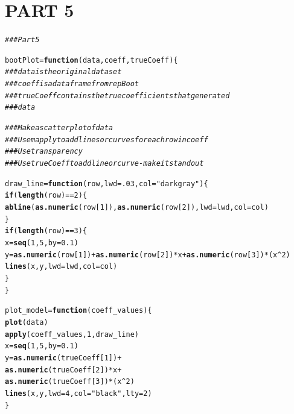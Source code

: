 \documentclass[11pt]{article}\usepackage[]{graphicx}\usepackage[]{color}
\makeatletter
\newcommand{\hlnum}[1]{\textcolor[rgb]{0.686,0.059,0.569}{#1}}%
\newcommand{\hlstr}[1]{\textcolor[rgb]{0.192,0.494,0.8}{#1}}%
\newcommand{\hlcom}[1]{\textcolor[rgb]{0.678,0.584,0.686}{\textit{#1}}}%
\newcommand{\hlopt}[1]{\textcolor[rgb]{0,0,0}{#1}}%
\newcommand{\hlstd}[1]{\textcolor[rgb]{0.345,0.345,0.345}{#1}}%
\newcommand{\hlkwa}[1]{\textcolor[rgb]{0.161,0.373,0.58}{\textbf{#1}}}%
\newcommand{\hlkwb}[1]{\textcolor[rgb]{0.69,0.353,0.396}{#1}}%
\newcommand{\hlkwc}[1]{\textcolor[rgb]{0.333,0.667,0.333}{#1}}%
\newcommand{\hlkwd}[1]{\textcolor[rgb]{0.737,0.353,0.396}{\textbf{#1}}}%
\newenvironment{kframe}{%
 \def\at@end@of@kframe{}%
 \ifinner\ifhmode%
  \def\at@end@of@kframe{\end{minipage}}%
  \begin{minipage}{\columnwidth}%
 \fi\fi%
 \def\FrameCommand##1{\hskip\@totalleftmargin \hskip-\fboxsep
 \colorbox{shadecolor}{##1}\hskip-\fboxsep
     \hskip-\linewidth \hskip-\@totalleftmargin \hskip\columnwidth}%
 \MakeFramed {\advance\hsize-\width
   \@totalleftmargin\z@ \linewidth\hsize
   \@setminipage}}%
 {\par\unskip\endMakeFramed%
 \at@end@of@kframe}
\newenvironment{knitrout}{}{} %
\makeatother
\begin{document}
\section{PART 5}
\begin{knitrout}
\color{fgcolor}\begin{kframe}
\begin{alltt}
\hlcom{## # Part 5}

\hlstd{bootPlot} \hlkwb{=} \hlkwa{function}\hlstd{(}\hlkwc{data}\hlstd{,} \hlkwc{coeff}\hlstd{,} \hlkwc{trueCoeff}\hlstd{)\{}
  \hlcom{### data is the original data set}
  \hlcom{### coeff is a data frame from repBoot}
  \hlcom{### trueCoeff contains the true coefficients that generated}
  \hlcom{### data}

  \hlcom{### Make a scatter plot of data}
  \hlcom{### Use mapply to add lines or curves for each row in coeff}
  \hlcom{### Use transparency}
  \hlcom{### Use trueCoeff to add line or curve - make it stand out}

  \hlstd{draw_line} \hlkwb{=} \hlkwa{function}\hlstd{(}\hlkwc{row}\hlstd{,} \hlkwc{lwd} \hlstd{=} \hlnum{.03}\hlstd{,} \hlkwc{col} \hlstd{=} \hlstr{"darkgray"}\hlstd{)\{}
    \hlkwa{if} \hlstd{(}\hlkwd{length}\hlstd{(row)} \hlopt{==} \hlnum{2}\hlstd{)\{}
      \hlkwd{abline}\hlstd{(}\hlkwd{as.numeric}\hlstd{(row[}\hlnum{1}\hlstd{]),} \hlkwd{as.numeric}\hlstd{(row[}\hlnum{2}\hlstd{]),}  \hlkwc{lwd} \hlstd{= lwd,} \hlkwc{col} \hlstd{= col)}
    \hlstd{\}}
    \hlkwa{if} \hlstd{(}\hlkwd{length}\hlstd{(row)} \hlopt{==} \hlnum{3}\hlstd{)\{}
      \hlstd{x} \hlkwb{=} \hlkwd{seq}\hlstd{(}\hlnum{1}\hlstd{,}\hlnum{5}\hlstd{,}\hlkwc{by}\hlstd{=}\hlnum{0.1}\hlstd{)}
      \hlstd{y} \hlkwb{=} \hlkwd{as.numeric}\hlstd{(row[}\hlnum{1}\hlstd{])} \hlopt{+} \hlkwd{as.numeric}\hlstd{(row[}\hlnum{2}\hlstd{])}\hlopt{*}\hlstd{x} \hlopt{+} \hlkwd{as.numeric}\hlstd{(row[}\hlnum{3}\hlstd{])}\hlopt{*}\hlstd{(x}\hlopt{^}\hlnum{2}\hlstd{)}
      \hlkwd{lines}\hlstd{(x, y,} \hlkwc{lwd} \hlstd{= lwd,} \hlkwc{col} \hlstd{= col)}
    \hlstd{\}}
  \hlstd{\}}

  \hlstd{plot_model} \hlkwb{=} \hlkwa{function}\hlstd{(}\hlkwc{coeff_values}\hlstd{)\{}
    \hlkwd{plot}\hlstd{(data)}
    \hlkwd{apply}\hlstd{(coeff_values,} \hlnum{1}\hlstd{, draw_line)}
    \hlstd{x} \hlkwb{=} \hlkwd{seq}\hlstd{(}\hlnum{1}\hlstd{,}\hlnum{5}\hlstd{,}\hlkwc{by}\hlstd{=}\hlnum{0.1}\hlstd{)}
    \hlstd{y} \hlkwb{=} \hlkwd{as.numeric}\hlstd{(trueCoeff[}\hlnum{1}\hlstd{])} \hlopt{+}
      \hlkwd{as.numeric}\hlstd{(trueCoeff[}\hlnum{2}\hlstd{])}\hlopt{*}\hlstd{x} \hlopt{+}
      \hlkwd{as.numeric}\hlstd{(trueCoeff[}\hlnum{3}\hlstd{])}\hlopt{*}\hlstd{(x}\hlopt{^}\hlnum{2}\hlstd{)}
    \hlkwd{lines}\hlstd{(x, y,} \hlkwc{lwd} \hlstd{=} \hlnum{4}\hlstd{,} \hlkwc{col} \hlstd{=} \hlstr{"black"}\hlstd{,} \hlkwc{lty}\hlstd{=}\hlnum{2}\hlstd{)}
  \hlstd{\}}


\end{alltt}
\end{kframe}
\end{knitrout}
\end{document}
